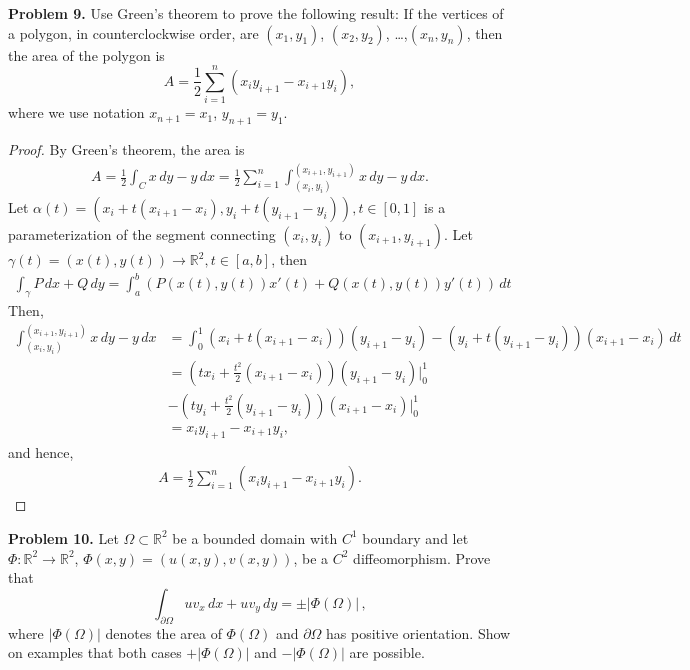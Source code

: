 \documentclass[12pt,leqno]{amsart}
\theoremstyle{definition}
\begin{document}
\medskip





\noindent
{\bf Problem 9.}
Use Green's theorem to prove the following result:
If the vertices of a polygon, in counterclockwise order, are
$(x_1,y_1)$, $(x_2,y_2)$, \ldots,$(x_n,y_n)$, then the area of the
polygon is
$$
A=\frac{1}{2}
\sum_{i=1}^n(x_iy_{i+1}-x_{i+1}y_i),
$$
where we use notation $x_{n+1}=x_1$, $y_{n+1}=y_1$.
\begin{proof}
By Green's theorem, the area is
\begin{align*}
    A = \frac{1}{2} \int_C x\, dy - y\, dx = \frac{1}{2} \sum^n_{i=1} \int^{(x_{i+1}, y_{i+1})}_{(x_{i}, y_{i})} x\, dy - y\, dx.
\end{align*}
Let $\alpha(t) = \left(x_i + t(x_{i+1} - x_{i}), y_i + t(y_{i+1} - y_{i}) \right), t\in [0,1]$ is a parameterization of the segment connecting $(x_{i}, y_{i})$ to $(x_{i+1}, y_{i+1})$. Let $\gamma(t) = (x(t), y(t)) \to \mathbb{R}^2, t \in [a,b]$, then 
\begin{align*}
    \int_\gamma P\, dx + Q\, dy = \int^b_a \left(P(x(t),y(t))x'(t) + Q(x(t),y(t))y'(t) \right)\, dt
\end{align*}
Then,
\begin{align*}
    \int^{(x_{i+1}, y_{i+1})}_{(x_{i}, y_{i})} x\, dy - y\, dx & = \int^1_0 (x_i + t(x_{i+1} - x_{i}))(y_{i+1} - y_i) - (y_i + t(y_{i+1} - y_{i}))(x_{i+1} - x_i)\, dt \\
    & = \left(tx_i + \frac{t^2}{2}(x_{i+1} - x_i)\right) (y_{i+1} - y_i)\Bigg|^1_0 \\
    & - \left(ty_i + \frac{t^2}{2} (y_{i+1} - y_i)\right) (x_{i+1} - x_i)\Bigg|^1_0 \\
    & = x_i y_{i+1} - x_{i+1} y_i,
\end{align*}
and hence,
\begin{align*}
    A = \frac{1}{2} \sum_{i=1}^n (x_i y_{i+1} - x_{i+1} y_i).
\end{align*}
\end{proof}


\medskip

\noindent
{\bf Problem 10.}
Let $\Omega\subset\mathbb{R}^2$ be a bounded
domain with $C^1$ boundary and let $\Phi:\mathbb{R}^2\to\mathbb{R}^2$,
$\Phi(x,y)=(u(x,y), v(x,y))$,
be a
$C^2$ diffeomorphism. Prove that
$$
\int_{\partial\Omega} uv_x\, dx + uv_y\, dy = \pm|\Phi(\Omega)|\, ,
$$
where $|\Phi(\Omega)|$ denotes the area of $\Phi(\Omega)$
and $\partial\Omega$ has positive orientation.
Show on examples that both cases $+|\Phi(\Omega)|$ and
$-|\Phi(\Omega)|$ are possible.
\end{document}
